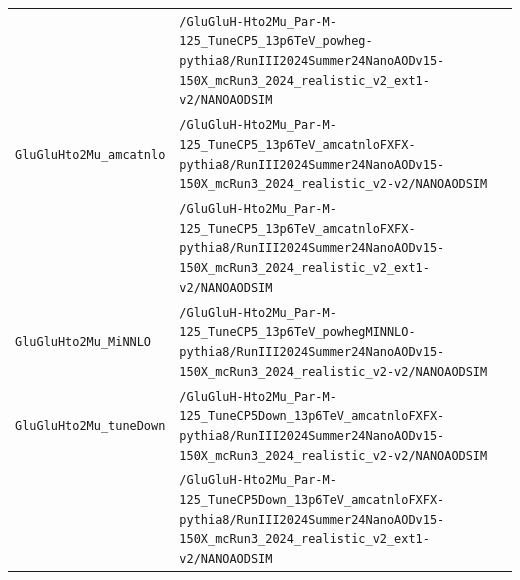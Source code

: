 \begin{longtable}{@{}>{\RaggedRight\arraybackslash}p{} >{\RaggedRight\arraybackslash}p{}@{}}
 & \texttt{/\allowbreak{}GluGluH-\allowbreak{}Hto2Mu\_\allowbreak{}Par-\allowbreak{}M-\allowbreak{}125\_\allowbreak{}TuneCP5\_\allowbreak{}13p6TeV\_\allowbreak{}powheg-\allowbreak{}pythia8/\allowbreak{}RunIII2024Summer24NanoAODv15-\allowbreak{}150X\_\allowbreak{}mcRun3\_\allowbreak{}2024\_\allowbreak{}realistic\_\allowbreak{}v2\_\allowbreak{}ext1-\allowbreak{}v2/\allowbreak{}NANOAODSIM} \\
\addlinespace[2pt]
\texttt{GluGluHto2Mu\_\allowbreak{}amcatnlo} & \texttt{/\allowbreak{}GluGluH-\allowbreak{}Hto2Mu\_\allowbreak{}Par-\allowbreak{}M-\allowbreak{}125\_\allowbreak{}TuneCP5\_\allowbreak{}13p6TeV\_\allowbreak{}amcatnloFXFX-\allowbreak{}pythia8/\allowbreak{}RunIII2024Summer24NanoAODv15-\allowbreak{}150X\_\allowbreak{}mcRun3\_\allowbreak{}2024\_\allowbreak{}realistic\_\allowbreak{}v2-\allowbreak{}v2/\allowbreak{}NANOAODSIM} \\
 & \texttt{/\allowbreak{}GluGluH-\allowbreak{}Hto2Mu\_\allowbreak{}Par-\allowbreak{}M-\allowbreak{}125\_\allowbreak{}TuneCP5\_\allowbreak{}13p6TeV\_\allowbreak{}amcatnloFXFX-\allowbreak{}pythia8/\allowbreak{}RunIII2024Summer24NanoAODv15-\allowbreak{}150X\_\allowbreak{}mcRun3\_\allowbreak{}2024\_\allowbreak{}realistic\_\allowbreak{}v2\_\allowbreak{}ext1-\allowbreak{}v2/\allowbreak{}NANOAODSIM} \\
\addlinespace[2pt]
\texttt{GluGluHto2Mu\_\allowbreak{}MiNNLO} & \texttt{/\allowbreak{}GluGluH-\allowbreak{}Hto2Mu\_\allowbreak{}Par-\allowbreak{}M-\allowbreak{}125\_\allowbreak{}TuneCP5\_\allowbreak{}13p6TeV\_\allowbreak{}powhegMINNLO-\allowbreak{}pythia8/\allowbreak{}RunIII2024Summer24NanoAODv15-\allowbreak{}150X\_\allowbreak{}mcRun3\_\allowbreak{}2024\_\allowbreak{}realistic\_\allowbreak{}v2-\allowbreak{}v2/\allowbreak{}NANOAODSIM} \\
\addlinespace[2pt]
\texttt{GluGluHto2Mu\_\allowbreak{}tuneDown} & \texttt{/\allowbreak{}GluGluH-\allowbreak{}Hto2Mu\_\allowbreak{}Par-\allowbreak{}M-\allowbreak{}125\_\allowbreak{}TuneCP5Down\_\allowbreak{}13p6TeV\_\allowbreak{}amcatnloFXFX-\allowbreak{}pythia8/\allowbreak{}RunIII2024Summer24NanoAODv15-\allowbreak{}150X\_\allowbreak{}mcRun3\_\allowbreak{}2024\_\allowbreak{}realistic\_\allowbreak{}v2-\allowbreak{}v2/\allowbreak{}NANOAODSIM} \\
 & \texttt{/\allowbreak{}GluGluH-\allowbreak{}Hto2Mu\_\allowbreak{}Par-\allowbreak{}M-\allowbreak{}125\_\allowbreak{}TuneCP5Down\_\allowbreak{}13p6TeV\_\allowbreak{}amcatnloFXFX-\allowbreak{}pythia8/\allowbreak{}RunIII2024Summer24NanoAODv15-\allowbreak{}150X\_\allowbreak{}mcRun3\_\allowbreak{}2024\_\allowbreak{}realistic\_\allowbreak{}v2\_\allowbreak{}ext1-\allowbreak{}v2/\allowbreak{}NANOAODSIM} \\

\end{longtable}
